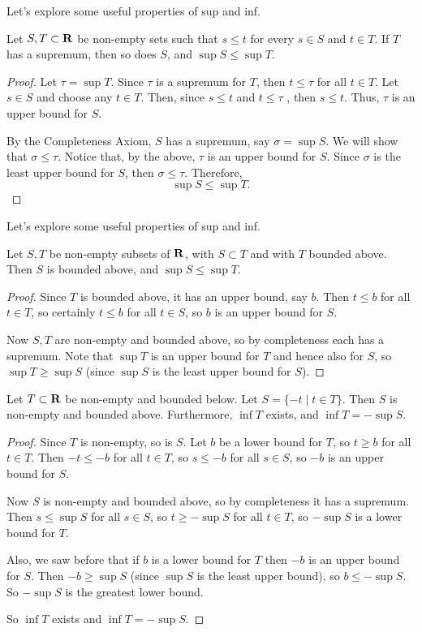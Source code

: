 Let's explore some useful properties of sup and inf.

\begin{proposition}
Let $S, T \subset \mathbf R$ be non-empty sets such that $s \le t$ for every $s \in S$ and $t \in T$. If $T$ has a supremum, then so does $S$, and $\sup S \le \sup T$.
\end{proposition}

\begin{proof}
Let $\tau = \sup T$. Since $\tau$ is a supremum for $T$, then $t \le \tau$ for all $t \in T$. Let $s \in S$ and choose any $t \in T$. Then, since $s \le t$ and $t \le \tau$ , then $s \le t$. Thus, $\tau$ is an upper bound for $S$. 

By the Completeness Axiom, $S$ has a supremum, say $\sigma = \sup S$. We will show that $\sigma \le \tau$. Notice that, by the above, $\tau$ is an upper bound for $S$. Since $\sigma$ is the least upper bound for $S$, then $\sigma \le \tau$. Therefore,
\[\sup S \le \sup T.\]
\end{proof}

Let's explore some useful properties of sup and inf.

\begin{proposition}
Let $S, T$ be non-empty subsets of $\mathbf R$, with $S \subset T$ and with $T$ bounded above. Then $S$ is bounded above, and $\sup S \le \sup T$.
\end{proposition}
\begin{proof}
Since $T$ is bounded above, it has an upper bound, say $b$. Then $t \le b$ for all $t \in T$, so certainly $t \le b$ for all $t \in S$, so $b$ is an upper bound for $S$.

Now $S, T$ are non-empty and bounded above, so by completeness each has a supremum. Note that $\sup T$ is an upper bound for $T$ and hence also for $S$, so $\sup T \ge \sup S$ (since $\sup S$ is the least upper bound for $S$).
\end{proof}

\begin{proposition}
Let $T \subset \mathbf R$ be non-empty and bounded below. Let $S = \{-t \mid t \in T\}$. Then $S$ is non-empty and bounded above. Furthermore, $\inf T$ exists, and $\inf T = -\sup S$.
\end{proposition}
\begin{proof}
Since $T$ is non-empty, so is $S$. Let $b$ be a lower bound for $T$, so $t \ge b$ for all $t \in T$. Then $-t \le -b$ for all $t \in T$, so $s \le -b$ for all $s \in S$, so $-b$ is an upper
bound for $S$.

Now $S$ is non-empty and bounded above, so by completeness it has a
supremum. Then $s \le \sup S$ for all $s \in S$, so $t \ge -\sup S$ for all $t \in T$, so $-\sup S$ is a lower bound for $T$.

Also, we saw before that if $b$ is a lower bound for $T$ then $-b$ is an upper bound for $S$. Then $-b \ge \sup S$ (since $\sup S$ is the least upper bound), so $b \le -\sup S$. So $-\sup S$ is the greatest lower bound.

So $\inf T$ exists and $\inf T = -\sup S$.
\end{proof}

